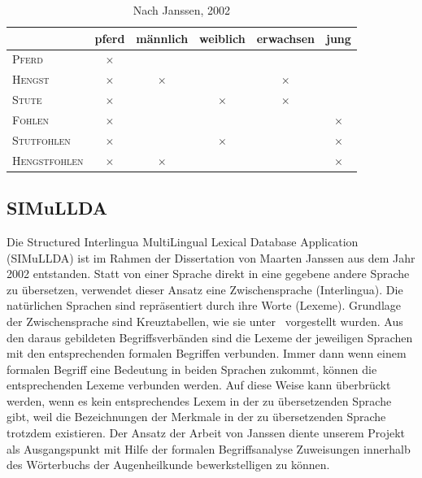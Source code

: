 \documentclass[pagesize,DIV=calc,12pt,draft]{scrreprt}
\begin{document}
\begin{table}[h!]
\centering
\renewcommand{\arraystretch}{2}
\begin{tabular}{@{}lccccc@{}}
\toprule&
pferd &
männlich &
weiblich &
erwachsen &
jung\\
\midrule
\textsc{Pferd}	&	$\times$	&&&&\\

\textsc{Hengst}	&	$\times$	&	$\times$	&&	$\times$	&\\

\textsc{Stute}	&	$\times$	&&	$\times$	&	$\times$	&\\

\textsc{Fohlen}	&	$\times$	&&&&	$\times$\\

\textsc{Stutfohlen}	&	$\times$	&&	$\times$	&&	$\times$\\

\textsc{Hengstfohlen}	&	$\times$	&	$\times$	&&&	$\times$\\
\bottomrule
\end{tabular}
\caption{Nach Janssen, 2002}
\end{table}


\subsection{SIMuLLDA}

Die Structured Interlingua MultiLingual Lexical Database Application
(SIMuLLDA) ist im Rahmen der Dissertation von Maarten Janssen aus dem
Jahr 2002 entstanden. Statt von einer Sprache direkt in eine gegebene
andere Sprache zu übersetzen, verwendet dieser Ansatz eine
Zwischensprache (Interlingua). Die natürlichen Sprachen sind
repräsentiert durch ihre Worte (Lexeme). Grundlage der Zwischensprache
sind Kreuztabellen, wie sie unter\emph{~} vorgestellt wurden. Aus den
daraus gebildeten Begriffsverbänden sind die Lexeme der jeweiligen
Sprachen mit den entsprechenden formalen Begriffen verbunden. Immer dann
wenn einem formalen Begriff eine Bedeutung in beiden Sprachen zukommt,
können die entsprechenden Lexeme verbunden werden. Auf diese Weise kann
überbrückt werden, wenn es kein entsprechendes Lexem in der zu
übersetzenden Sprache gibt, weil die Bezeichnungen der Merkmale in der
zu übersetzenden Sprache trotzdem existieren. Der Ansatz der Arbeit von
Janssen diente unserem Projekt als Ausgangspunkt mit Hilfe der formalen
Begriffsanalyse Zuweisungen innerhalb des Wörterbuchs der Augenheilkunde
bewerkstelligen zu können.
\end{document}
